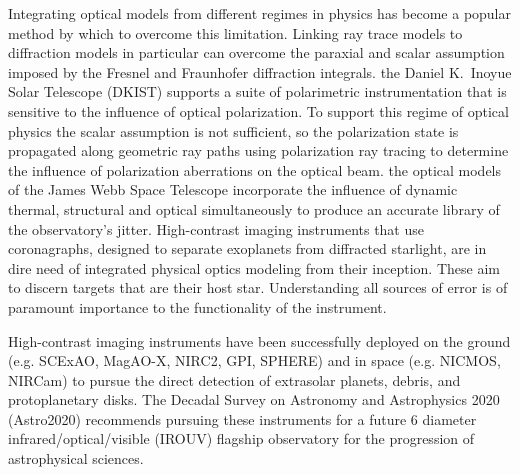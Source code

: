 Integrating optical models from different regimes in physics has become a popular method by which to overcome this limitation. Linking ray trace models to diffraction models in particular can overcome the paraxial and scalar assumption imposed by the Fresnel and Fraunhofer diffraction integrals.   the Daniel K.~Inoyue Solar Telescope (DKIST) supports a suite of polarimetric instrumentation that is sensitive to the influence of optical polarization. To support this regime of optical physics the scalar assumption is not sufficient, so the polarization state is propagated along geometric ray paths using polarization ray tracing\cite{Chippman15,anche_inprep} to determine the influence of polarization aberrations on the optical beam\cite{Harrington2017}.  the optical models of the James Webb Space Telescope incorporate the influence of dynamic thermal, structural and optical  simultaneously to produce an accurate library of the observatory's jitter\cite{Mather2004}. High-contrast imaging instruments that use coronagraphs, designed to separate exoplanets from diffracted starlight, are in dire need of integrated physical optics modeling from their inception. These  aim to discern targets that are  their host star\cite{Guyon_2006,2015ApJStark,2018Pueyo}. Understanding all sources of error is of paramount importance to the functionality of the instrument.

High-contrast imaging instruments have been successfully deployed on the ground (e.g. SCExAO\cite{Lozi18}, MagAO-X\cite{Males18}, NIRC2\cite{Femenia16}, GPI\cite{Macintosh14}, SPHERE\cite{refId0}) and in space (e.g. NICMOS\cite{thompson_near_1994}, NIRCam\cite{horner_near-infrared_2004,Nircam_exoplanet}) to pursue the direct detection of extrasolar planets, debris, and protoplanetary disks. 
The Decadal Survey on Astronomy and Astrophysics 2020 (Astro2020) recommends pursuing these instruments for a future 6 diameter infrared/optical/visible (IROUV) flagship observatory for the progression of astrophysical sciences\cite{decadal_survey_on_astronomy_and_astrophysics_2020_astro2020_pathways_2021}. 

